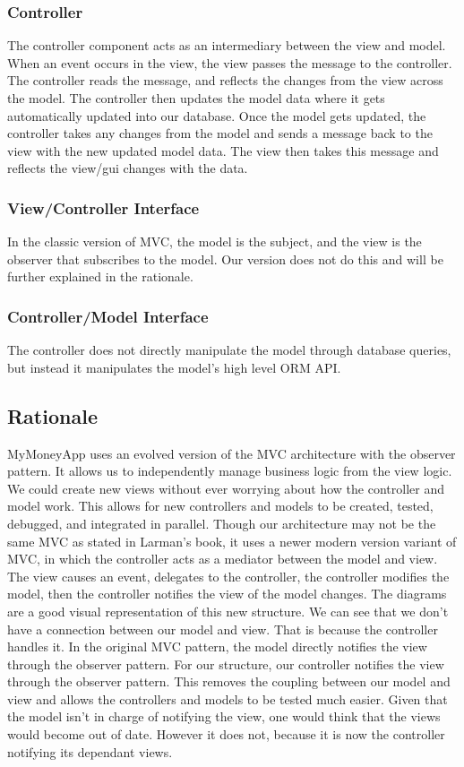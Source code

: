 \documentclass[12pt]{article}
\begin{document}
\subsubsection{Controller}
The controller component acts as an intermediary between the view and model. When an event occurs in the view, the view passes the message to the controller. The controller reads the message, and reflects the changes from the view across the model. The controller then updates the model data where it gets automatically updated into our database. Once the model gets updated, the controller takes any changes from the model and sends a message back to the view with the new updated model data. The view then takes this message and reflects the view/gui changes with the data.


\subsubsection{View/Controller Interface}

In the classic version of MVC, the model is the subject, and the view is the observer that subscribes to the model. Our version does not do this and will be further explained in the rationale.

\subsubsection{Controller/Model Interface}

The controller does not directly manipulate the model through database queries, but instead it manipulates the model’s high level ORM API.

\subsection{Rationale}
MyMoneyApp uses an evolved version of the MVC architecture with the observer pattern. It allows us to independently manage business logic from the view logic. We could create new views without ever worrying about how the controller and model work. This allows for new controllers and models to be created, tested, debugged, and integrated in parallel.
Though our architecture may not be the same MVC as stated in Larman’s book, it uses a newer modern version variant of MVC, in which the controller acts as a mediator between the model and view. The view causes an event, delegates to the controller, the controller modifies the model, then the controller notifies the view of the model changes. The diagrams are a good visual representation of this new structure. We can see that we don't have a connection between our model and view. That is because the controller handles it. In the original MVC pattern, the model directly notifies the view through the observer pattern. For our structure, our controller notifies the view through the observer pattern. This removes the coupling between our model and view and allows the controllers and models to be tested much easier. Given that the model isn’t in charge of notifying the view, one would think that the views would become out of date. However it does not, because it is now the controller notifying its dependant views.
\end{document}
